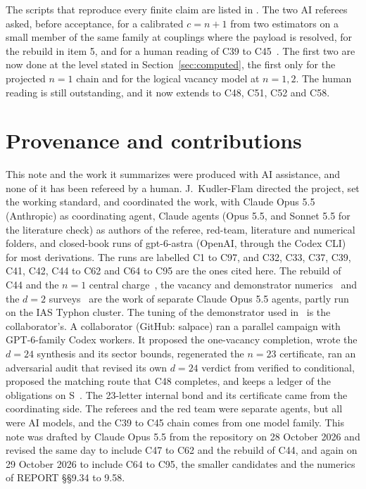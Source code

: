 \documentclass[11pt]{article}
\theoremstyle{definition}
\begin{document}
The scripts that reproduce every finite claim are listed in . The two AI referees asked, before acceptance, for a calibrated $c=n+1$ from two estimators on a small member of the same family at couplings where the payload is resolved, for the rebuild in item 5, and for a human reading of C39 to C45~\cite{refC44,refd24}. The first two are now done at the level stated in Section~\ref{sec:computed}, the first only for the projected $n=1$ chain and for the logical vacancy model at $n=1,2$. The human reading is still outstanding, and it now extends to C48, C51, C52 and C58.

\section{Provenance and contributions}

This note and the work it summarizes were produced with AI assistance, and none of it has been refereed by a human. J.~Kudler-Flam directed the project, set the working standard, and coordinated the work, with Claude Opus 5.5 (Anthropic) as coordinating agent, Claude agents (Opus 5.5, and Sonnet 5.5 for the literature check) as authors of the referee, red-team, literature and numerical folders, and closed-book runs of gpt-6-astra (OpenAI, through the Codex CLI) for most derivations. The runs are labelled C1 to C97, and C32, C33, C37, C39, C41, C42, C44 to C62 and C64 to C95 are the ones cited here. The rebuild of C44 and the $n=1$ central charge~\cite{verC44}, the vacancy and demonstrator numerics~\cite{vacnum,vacn2,demoLL} and the $d=2$ surveys~\cite{d2grid} are the work of separate Claude Opus 5.5 agents, partly run on the IAS Typhon cluster. The tuning of the demonstrator used in~\cite{demoLL} is the collaborator's. A collaborator (GitHub: salpace) ran a parallel campaign with GPT-6-family Codex workers. It proposed the one-vacancy completion, wrote the $d=24$ synthesis and its sector bounds, regenerated the $n=23$ certificate, ran an adversarial audit that revised its own $d=24$ verdict from verified to conditional, proposed the matching route that C48 completes, and keeps a ledger of the obligations on S~\cite{campaign,audit,direct,thermal}. The 23-letter internal bond and its certificate came from the coordinating side. The referees and the red team were separate agents, but all were AI models, and the C39 to C45 chain comes from one model family. This note was drafted by Claude Opus 5.5 from the repository on 28 October 2026 and revised the same day to include C47 to C62 and the rebuild of C44, and again on 29 October 2026 to include C64 to C95, the smaller candidates and the numerics of REPORT \S\S9.34 to 9.58.
\end{document}
